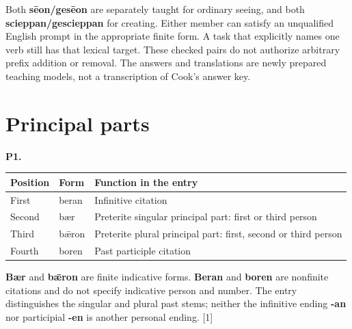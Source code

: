 Both \textbf{sēon/\allowbreak{}gesēon} are separately taught for ordinary seeing, and both \textbf{scieppan/\allowbreak{}gescieppan} for creating. Either member can satisfy an unqualified English prompt in the appropriate finite form. A task that explicitly names one verb still has that lexical target. These checked pairs do not authorize arbitrary prefix addition or removal. The answers and translations are newly prepared teaching models, not a transcription of Cook's answer key.

\section*{Principal parts}

\par\begin{minipage}{\linewidth}\raggedright
\textbf{P1.}

\par\begingroup
\fontsize{10.5}{13.2}\selectfont
\setlength{\LTleft}{0pt}\setlength{\LTright}{\fill}
\noindent
\begin{tabular}{@{}>{\raggedright\arraybackslash}p{22.17mm}>{\raggedright\arraybackslash}p{22.17mm}>{\raggedright\arraybackslash}p{74.04mm}@{}}
\toprule
\textbf{Position} & \textbf{Form} & \textbf{Function in the entry} \\
\midrule
First & beran & Infinitive citation \\
Second & bær & Preterite singular principal part: first or third person \\
Third & bǣron & Preterite plural principal part: first, second or third person \\
Fourth & boren & Past participle citation \\
\bottomrule
\end{tabular}
\par\endgroup

\textbf{Bær} and \textbf{bǣron} are finite indicative forms. \textbf{Beran} and \textbf{boren} are nonfinite citations and do not specify indicative person and number. The entry distinguishes the singular and plural past stems; neither the infinitive ending \textbf{-an} nor participial \textbf{-en} is another personal ending. [1]

\end{minipage}\par\addvspace{4pt}

